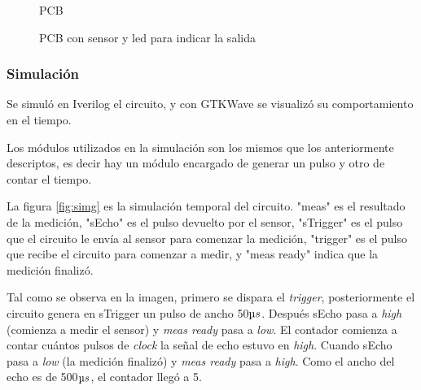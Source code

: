 \documentclass[../../e3_tp2_main.tex]{subfiles}
\begin{document}
\begin{figure}[H]	
	\centering
	\caption{PCB}
\end{figure}

\begin{figure}[H]	
	\centering
	\caption{PCB con sensor y led para indicar la salida}
\end{figure}

\subsubsection{Simulación}
Se simul\'o en Iverilog el circuito, y con GTKWave se visualizó su comportamiento en el tiempo.
\par Los módulos utilizados en la simulación son los mismos que los anteriormente descriptos, es decir hay un módulo encargado de generar un pulso y otro de contar el tiempo.\par

La figura \ref{fig:simg} es la simulación temporal del circuito. "meas" es el resultado de la medición, "sEcho" es el pulso devuelto por el sensor, "sTrigger" es el pulso que el circuito le envía al sensor para comenzar la medición, "trigger" es el pulso que recibe el circuito para comenzar a medir, y "meas ready" indica que la medición finaliz\'o.
\par Tal como se observa en la imagen, primero se dispara el \textit{trigger}, posteriormente el circuito genera en sTrigger un pulso de ancho 50$\micro s$. Despu\'es sEcho pasa a \textit{high} (comienza a medir el sensor) y \textit{meas ready} pasa a \textit{low}. El contador comienza a contar cu\'antos pulsos de \textit{clock} la señal de echo estuvo en \textit{high}. Cuando sEcho pasa a \textit{low} (la medición finaliz\'o) y \textit{meas ready} pasa a \textit{high}. Como el ancho del echo es de 500$\micro s$, el contador llegó a 5.
\end{document}
